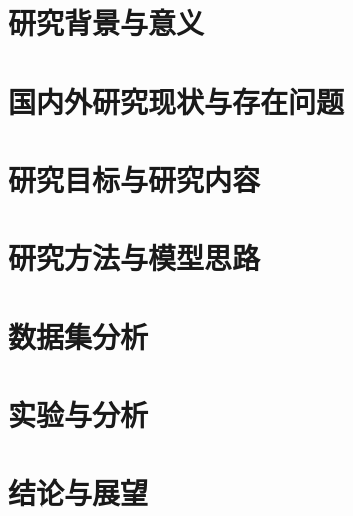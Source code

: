 \documentclass[11pt]{article}
\begin{document}

% 




\newpage
\tableofcontents
\thispagestyle{empty}%


\newpage
\setcounter{page}{1}%
\section{研究背景与意义}


\newpage
\section{国内外研究现状与存在问题}


\newpage
\section{研究目标与研究内容}


\newpage
\section{研究方法与模型思路}


\newpage
\section{数据集分析}


\newpage
\section{实验与分析}


\newpage
\section{结论与展望}



%     

\newpage

{
	\small
	
	
}
\end{document}
